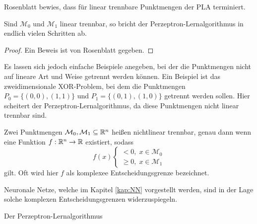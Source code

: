 Rosenblatt\cite{rosenblatt1958perceptron} bewies, dass für linear trennbare Punktmengen der PLA terminiert.

\begin{satz}
    Sind $\mathcal{M}_0$ und $\mathcal{M}_1$ linear trennbar, so bricht der Perzeptron-Lernalgorithmus in endlich vielen Schritten ab.
\end{satz}
\begin{proof}
    Ein Beweis ist von Rosenblatt\cite{rosenblatt1958perceptron} gegeben.
\end{proof}

Es lassen sich jedoch einfache Beispiele anegeben, bei der die Punktmengen nicht auf lineare Art und Weise getrennt werden können. Ein Beispiel ist das zweidimensionale XOR-Problem, bei dem die Punktmengen $P_0=\{(0,0), (1,1)\}$ und $P_1=\{(0,1), (1,0) \}$ getrennt werden sollen. Hier scheitert der Perzeptron-Lernalgorithmus, da diese Punktmengen nicht linear trennbar sind.

\begin{defi}
    Zwei Punktmengen $\mathcal{M}_0, \mathcal{M}_{1} \subseteq \mathbb{R}^n$ heißen nichtlinear trennbar, genau dann wenn eine Funktion $f: \mathbb{R}^n \rightarrow \mathbb{R}$ existiert, sodass
    \begin{equation*}
        f(x) \begin{cases}
            <0, \; x \in \mathcal{M}_{0} \\
            \geq 0, \; x \in \mathcal{M}_1
        \end{cases}
    \end{equation*}
    gilt. Oft wird hier $f$ als komplexee Entscheidungsgrenze bezeichnet.
\end{defi}
Neuronale Netze, welche im Kapitel \ref{kap:NN} vorgestellt werden, sind in der Lage solche komplexen Entscheidungsgrenzen widerzuspiegeln.
\begin{algorithm}[h]
    \caption{Der Perzeptron-Lernalgorithmus}\label{alg:pla}
\end{algorithm}

